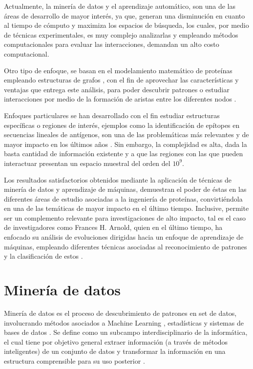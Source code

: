 Actualmente, la minería de datos y el aprendizaje automático, son una de las áreas de desarrollo de mayor interés, ya que, generan una disminución en cuanto al tiempo de cómputo y maximiza los espacios de búsqueda, los cuales, por medio de técnicas experimentales, es muy complejo analizarlas y empleando métodos computacionales para evaluar las interacciones, demandan un alto costo computacional.

Otro tipo de enfoque, se basan en el modelamiento matemático de proteínas empleando estructuras de grafos \cite{canutescu2003graph, vishveshwara2002protein}, con el fin de aprovechar las características y ventajas que entrega este análisis, para poder descubrir patrones o estudiar interacciones por medio de la formación de aristas entre los diferentes nodos \cite{martin2017loto}.

Enfoques particulares se han desarrollado con el fin estudiar estructuras específicas o regiones de interés, ejemplos como la identificación de epítopes en secuencias lineales de antígenos, son una de las problemáticas más relevantes y de mayor impacto en los últimos años \cite{jespersen2017bepipred, odorico2003bepitope, saha2008abcpred}. Sin embargo, la complejidad es alta, dada la basta cantidad de información existente y a que las regiones con las que pueden interactuar presentan un espacio muestral del orden del $10^9$.

Los resultados satisfactorios obtenidos mediante la aplicación de técnicas de minería de datos y aprendizaje de máquinas, demuestran el poder de éstas en las diferentes áreas de estudio asociadas a la ingeniería de proteínas, convirtiéndola en una de las temáticas de mayor impacto en el último tiempo. Inclusive, permite ser un complemento relevante para investigaciones de alto impacto, tal es el caso de investigadores como Frances H. Arnold, quien en el último tiempo, ha enfocado su análisis de evoluciones dirigidas hacia un enfoque de aprendizaje de máquinas, empleando diferentes técnicas asociadas al reconocimiento de patrones y la clasificación de estos \cite{bedbrook2019machine, wu2019machine, yang2018machine}.

\section{Minería de datos}


Minería de datos es el proceso de descubrimiento de patrones en set de datos, involucrando métodos asociados a Machine Learning \cite{michie1994machine}, estadísticas y sistemas de bases de datos \cite{hand2006data}. Se define como un subcampo interdisciplinario de la informática, el cual tiene por objetivo general extraer información (a través de métodos inteligentes) de un conjunto de datos y transformar la información en una estructura comprensible para su uso posterior \cite{fayyad1996knowledge, dunham2006data}. 

